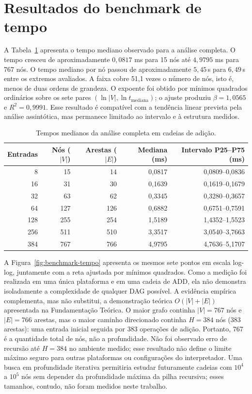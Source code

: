 \documentclass[12pt,openright,oneside,a4paper,brazil]{abntex2}
\begin{document}
\section{Resultados do benchmark de tempo}
A Tabela~\ref{tab:benchmark-tempo} apresenta o tempo mediano observado para a análise completa. O tempo cresceu de aproximadamente $0{,}0817$ ms para 15 nós até $4{,}9795$ ms para 767 nós. O tempo mediano por nó passou de aproximadamente $5{,}45$\,\textmu s para $6{,}49$\,\textmu s entre os extremos avaliados. A faixa cobre 51,1 vezes o número de nós, isto é, menos de duas ordens de grandeza. O expoente foi obtido por mínimos quadrados ordinários sobre os sete pares $(\ln |V|,\ln t_{\mathrm{mediana}})$; o ajuste produziu $\beta=1{,}0565$ e $R^2=0{,}9991$. Esse resultado é compatível com a tendência linear prevista pela análise assintótica, mas permanece limitado ao intervalo e à estrutura medidos.

\begin{table}[H]
\centering
\small
\caption{Tempos medianos da análise completa em cadeias de adição.}
\label{tab:benchmark-tempo}
\begin{tabular}{r r r r r}
\toprule
Entradas & Nós ($|V|$) & Arestas ($|E|$) & Mediana (ms) & Intervalo P25--P75 (ms)\\
\midrule
8 & 15 & 14 & 0,0817 & 0,0809--0,0836\\
16 & 31 & 30 & 0,1639 & 0,1619--0,1679\\
32 & 63 & 62 & 0,3345 & 0,3280--0,3657\\
64 & 127 & 126 & 0,6882 & 0,6751--0,7591\\
128 & 255 & 254 & 1,5189 & 1,4352--1,5523\\
256 & 511 & 510 & 3,3517 & 3,0540--3,7663\\
384 & 767 & 766 & 4,9795 & 4,7636--5,1707\\
\bottomrule
\end{tabular}
\end{table}

A Figura~\ref{fig:benchmark-tempo} apresenta os mesmos sete pontos em escala log-log, juntamente com a reta ajustada por mínimos quadrados. Como a medição foi realizada em uma única plataforma e em uma cadeia de ADD, ela não demonstra isoladamente a complexidade de qualquer DAG possível. A evidência empírica complementa, mas não substitui, a demonstração teórica $O(|V|+|E|)$ apresentada na Fundamentação Teórica. O maior grafo continha $|V|=767$ nós e $|E|=766$ arestas, mas o maior caminho direcionado continha $H=384$ nós (383 arestas): uma entrada inicial seguida por 383 operações de adição. Portanto, 767 é a quantidade total de nós, não a profundidade. Não foi observado erro de recursão até $H=384$ no ambiente medido; esse resultado não define o limite máximo seguro para outras plataformas ou configurações do interpretador. Uma busca em profundidade iterativa permitiria estudar futuramente cadeias com $10^4$ a $10^5$ nós sem depender da profundidade máxima da pilha recursiva; esses tamanhos, contudo, não foram medidos neste trabalho.
\end{document}
